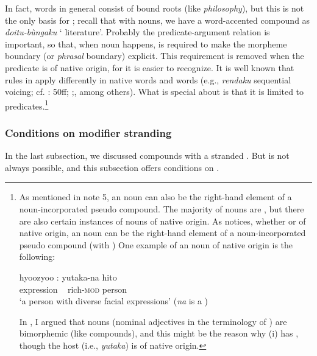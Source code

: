 \documentclass[output=paper]{LSP/langsci}
\begin{document}
In fact,  words in general consist of bound roots (like \textit{philosophy}), but this is not the only basis for ; recall that with  nouns, we have a word-accented compound as \textit{doitu-bùngaku} ‘ literature’. Probably the predicate-argument relation is important, so that, when noun  happens,  is required to make the morpheme boundary (or \textit{phrasal} boundary) explicit. This requirement is removed when the predicate is of native origin, for it is easier to recognize. It is well known that  rules in  apply differently in native words and  words (e.g., \textit{rendaku} sequential voicing; cf. \citealt{Tsujimura2007}: 50ff;    \citealt{ItoMester2003};\citealt{Kubozono2005}, among others). What is special about  is that it is limited to predicates.\footnote{As mentioned in note 5, an  noun can also be the right-hand element of a noun-incorporated pseudo compound. The majority of  nouns are , but there are also certain instances of  nouns of native origin. As \citet[241]{Kageyama1993} notices, whether  or of native origin, an  noun can be the right-hand element of a noun-incorporated pseudo compound (with ) One example of an  noun of native origin is the following:  

\ea\label{ex:nishiyama:fn13} 
\gll hyoozyoo  :  yutaka-na  hito    \\
expression ~ rich-\textsc{mod} person\\
\glt ‘a person with diverse facial expressions’ (\textit{na} is a  ) 
\z

In \citet{Nishiyama1999}, I argued that  nouns (nominal adjectives in the terminology of \citet{Nishiyama1999}) are bimorphemic (like compounds), and this might be the reason why (i) has , though the  host (i.e., \textit{yutaka}) is of native origin.}

\subsubsection{Conditions on modifier stranding}\label{sec:nishiyama:3.2.2}\largerpage
In the last subsection, we discussed compounds with a stranded . But   is not always possible, and this subsection offers conditions on  .
\end{document}
